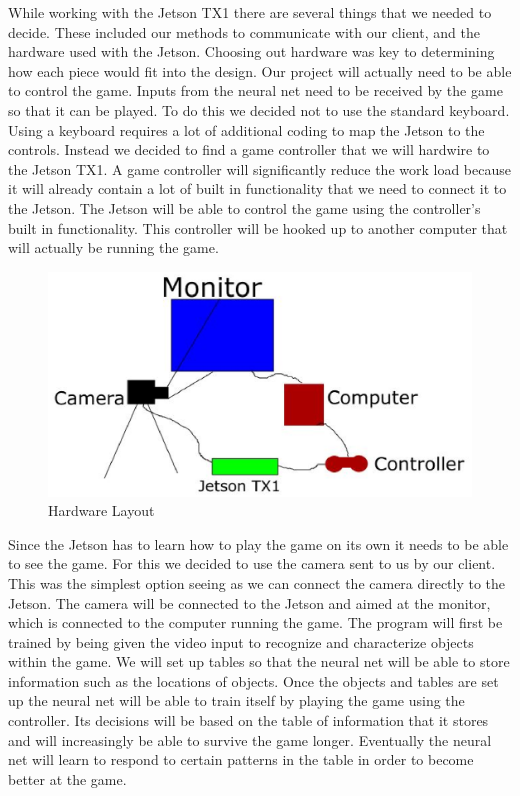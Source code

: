 \documentclass{onecolumn, draftclsnofoot,10pt, compsoc}[IEEEtran
\begin{document}
While working with the Jetson TX1 there are several things that we needed to decide.
These included our methods to communicate with our client, and the hardware used with the Jetson.
Choosing out hardware was key to determining how each piece would fit into the design.
\newline
\newline
Our project will actually need to be able to control the game.
Inputs from the neural net need to be received by the game so that it can be played.
To do this we decided not to use the standard keyboard.
Using a keyboard requires a lot of additional coding to map the Jetson to the controls.
Instead we decided to find a game controller that we will hardwire to the Jetson TX1.
A game controller will significantly reduce the work load because it will already contain a lot of built in functionality that we need to connect it to the Jetson.
The Jetson will be able to control the game using the controller's built in functionality.
This controller will be hooked up to another computer that will actually be running the game.
\newline
\newline
\begin{figure}
  \includegraphics[width=\textwidth]{design.eps}
  \caption{Hardware Layout}
  \label{fig:4.3}
\end{figure}%
Since the Jetson has to learn how to play the game on its own it needs to be able to see the game.
For this we decided to use the camera sent to us by our client.
This was the simplest option seeing as we can connect the camera directly to the Jetson.
The camera will be connected to the Jetson and aimed at the monitor, which is connected to the computer running the game.
The program will first be trained by being given the video input to recognize and characterize objects within the game.
We will set up tables so that the neural net will be able to store information such as the locations of objects.
Once the objects and tables are set up the neural net will be able to train itself by playing the game using the controller.
Its decisions will be based on the table of information that it stores and will increasingly be able to survive the game longer.
Eventually the neural net will learn to respond to certain patterns in the table in order to become better at the game.
\end{document}
